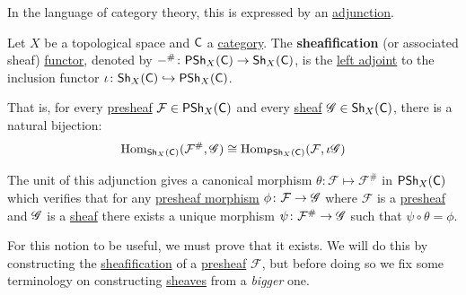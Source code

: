\documentclass[../../main]{subfiles}
\begin{document}
In the language of category theory, this is expressed by an \hyperref[def:adjoint-functors]{adjunction}.
\begin{definition}[Sheafification] \label{def:sheafification}
    Let \(X\) be a topological space and \(\mathsf{C}\) a \hyperref[def:category]{category}.
    The \textbf{sheafification} (or associated sheaf) \hyperref[def:functor]{functor}, denoted by \(-^{\#}\colon \mathsf{PSh}_{X}(\mathsf{C}) \to \mathsf{Sh}_{X}(\mathsf{C})\), is the \hyperref[def:adjoint-functors]{left adjoint} to the inclusion functor \(\iota\colon \mathsf{Sh}_{X}(\mathsf{C}) \hookrightarrow \mathsf{PSh}_{X}(\mathsf{C})\).

    That is, for every \hyperref[def:presheaf]{presheaf} \(\mathcal{F} \in \mathsf{PSh}_{X}(\mathsf{C})\) and every \hyperref[def:sheaf]{sheaf} \(\mathscr{G} \in \mathsf{Sh}_{X}(\mathsf{C})\), there is a natural bijection:
    \begin{equation*}
        \operatorname{Hom}_{\mathsf{Sh}_{X}(\mathsf{C})}(\mathcal{F}^{\#}, \mathscr{G}) \cong \operatorname{Hom}_{\mathsf{PSh}_{X}(\mathsf{C})}(\mathcal{F}, \iota\mathscr{G})
    \end{equation*}

    The unit of this adjunction gives a canonical morphism \(\theta\colon \mathcal{F} \mapsto \mathcal{F}^{\#}\) in \(\mathsf{PSh}_{X}(\mathsf{C})\) which verifies that for any \hyperref[def:presheaf]{presheaf morphism} \(\phi\colon \mathcal{F} \to \mathscr{G}\) where \(\mathcal{F}\) is a \hyperref[def:presheaf]{presheaf} and \(\mathscr{G}\) is a \hyperref[def:sheaf]{sheaf} there exists a unique morphism \(\psi\colon \mathcal{F}^{\#} \to \mathscr{G}\) such that \(\psi \circ \theta = \phi\).
\end{definition}

For this notion to be useful, we must prove that it exists.
We will do this by constructing the \hyperref[def:sheafification]{sheafification} of a \hyperref[def:presheaf]{presheaf} \(\mathcal{F}\), but before doing so we fix some terminology on constructing \hyperref[def:sheaf]{sheaves} from a \textit{bigger} one.
\end{document}
